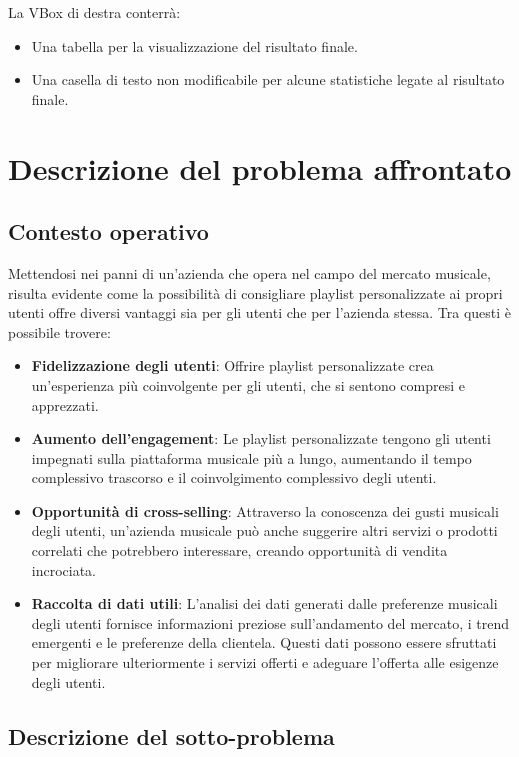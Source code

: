 \documentclass[12pt, a4paper]{article}
\begin{document}
La VBox di destra conterrà:
\begin{itemize}
\item Una tabella per la visualizzazione del risultato finale.
\item Una casella di testo non modificabile per alcune statistiche legate al risultato finale.
\end{itemize}

\newpage
\section{Descrizione del problema affrontato}

\subsection{Contesto operativo}

Mettendosi nei panni di un'azienda che opera nel campo del mercato  musicale, risulta evidente come la possibilità di consigliare playlist personalizzate ai propri utenti offre diversi vantaggi sia per gli utenti che per l'azienda stessa. Tra questi è possibile trovere:
\begin{itemize}
\item \textbf{Fidelizzazione degli utenti}: Offrire playlist personalizzate crea un'esperienza più coinvolgente per gli utenti, che si sentono compresi e apprezzati.
\item \textbf{Aumento dell'engagement}: Le playlist personalizzate tengono gli utenti impegnati sulla piattaforma musicale più a lungo, aumentando il tempo complessivo trascorso e il coinvolgimento complessivo degli utenti.
\item \textbf{Opportunità di cross-selling}: Attraverso la conoscenza dei gusti musicali degli utenti, un'azienda musicale può anche suggerire altri servizi o prodotti correlati che potrebbero interessare, creando opportunità di vendita incrociata.
\item \textbf{Raccolta di dati utili}: L'analisi dei dati generati dalle preferenze musicali degli utenti fornisce informazioni preziose sull'andamento del mercato, i trend emergenti e le preferenze della clientela. Questi dati possono essere sfruttati per migliorare ulteriormente i servizi offerti e adeguare l'offerta alle esigenze degli utenti.
\end{itemize}

\subsection{Descrizione del sotto-problema}
\end{document}
